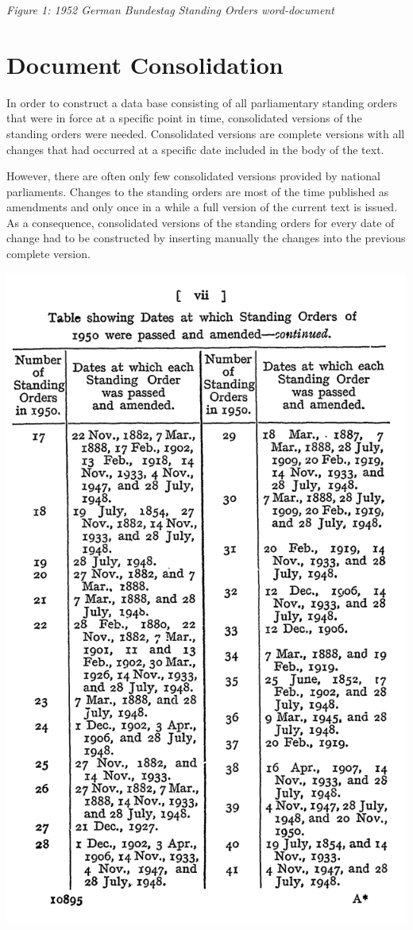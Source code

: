 \documentclass[10pt,]{article}
\begin{document}
\emph{Figure 1: 1952 German Bundestag Standing Orders word-document}

\newpage

\section{Document Consolidation}\label{document-consolidation}

In order to construct a data base consisting of all parliamentary
standing orders that were in force at a specific point in time,
consolidated versions of the standing orders were needed. Consolidated
versions are complete versions with all changes that had occurred at a
specific date included in the body of the text.

However, there are often only few consolidated versions provided by
national parliaments. Changes to the standing orders are most of the
time published as amendments and only once in a while a full version of
the current text is issued. As a consequence, consolidated versions of
the standing orders for every date of change had to be constructed by
inserting manually the changes into the previous complete version.

\begin{center}
\includegraphics[height=0.7\textheight]{fig/fig1a.png}
\end{center}
\end{document}
